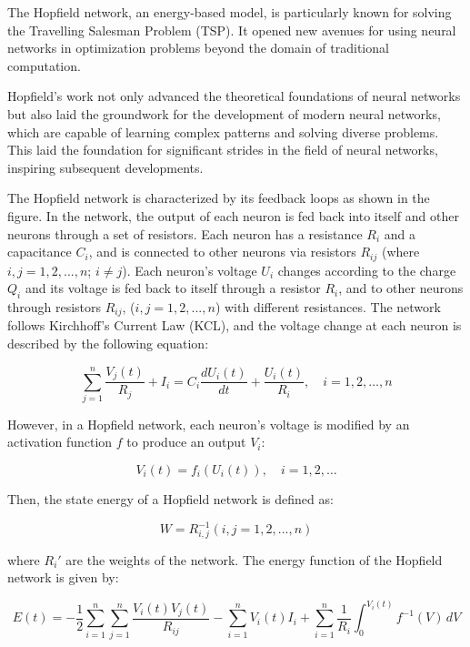 \documentclass[paper=a4, fontsize=11pt]{scrartcl} %
\numberwithin{equation}{section} %
\numberwithin{figure}{section} %
\numberwithin{table}{section} %
\begin{document}
The Hopfield network, an energy-based model, is particularly known for solving the Travelling Salesman Problem (TSP). It opened new avenues for using neural networks in optimization problems beyond the domain of traditional computation.

Hopfield's work not only advanced the theoretical foundations of neural networks but also laid the groundwork for the development of modern neural networks, which are capable of learning complex patterns and solving diverse problems. This laid the foundation for significant strides in the field of neural networks, inspiring subsequent developments.

The Hopfield network is characterized by its feedback loops as shown in the figure. In the network, the output of each neuron is fed back into itself and other neurons through a set of resistors. Each neuron has a resistance \( R_i \) and a capacitance \( C_i \), and is connected to other neurons via resistors \( R_{ij} \) (where \( i,j = 1,2,...,n \); \( i \neq j \)). Each neuron's voltage \( U_i \) changes according to the charge \( Q_i \) and its voltage is fed back to itself through a resistor \( R_i \), and to other neurons through resistors \( R_{ij} \), (\( i,j = 1,2,...,n \)) with different resistances. The network follows Kirchhoff's Current Law (KCL), and the voltage change at each neuron is described by the following equation:

\begin{equation}
    \sum_{j=1}^{n} \frac{V_j(t)}{R_j} + I_i = C_i \frac{dU_i(t)}{dt} + \frac{U_i(t)}{R_i}, \quad i = 1, 2, \ldots, n
\end{equation}

However, in a Hopfield network, each neuron's voltage is modified by an activation function \( f \) to produce an output \( V_i \):

\begin{equation}
    V_i(t) = f_i(U_i(t)), \quad i = 1, 2, \ldots
\end{equation}

Then, the state energy of a Hopfield network is defined as:

\begin{equation}
W = R_{i,j}^{-1} (i,j=1,2,...,n)
\end{equation}

where \( R_i' \) are the weights of the network. The energy function of the Hopfield network is given by:

\begin{equation}
    E(t) = -\frac{1}{2} \sum_{i=1}^{n} \sum_{j=1}^{n} \frac{V_i(t)V_j(t)}{R_{ij}} - \sum_{i=1}^{n} V_i(t)I_i + \sum_{i=1}^{n} \frac{1}{R_i} \int_{0}^{V_i(t)} f^{-1}(V) \, dV
\end{equation}
\end{document}
